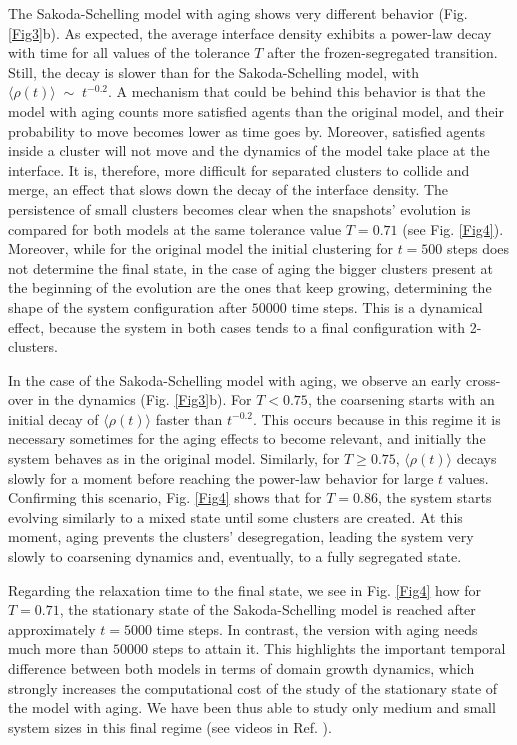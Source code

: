 The Sakoda-Schelling model with aging shows very different behavior (Fig. \ref{Fig3}b). As expected, the average interface density exhibits a power-law decay with time for all values of the tolerance $T$ after the frozen-segregated transition. Still, the decay is slower than for the Sakoda-Schelling model, with $\langle \rho (t)\rangle \; \sim \; t^{-0.2}$. A mechanism that could be behind this behavior is that the model with aging counts more satisfied agents than the original model, and their probability to move becomes lower as time goes by. Moreover, satisfied agents inside a cluster will not move and the dynamics of the model take place at the interface. It is, therefore, more difficult for separated clusters to collide and merge, an effect that slows down the decay of the interface density. The persistence of small clusters becomes clear when the snapshots' evolution is compared for both models at the same tolerance value $T = 0.71$ (see Fig. \ref{Fig4}). Moreover, while for the original model the initial clustering for $t = 500$ steps does not determine the final state, in the case of aging the bigger clusters present at the beginning of the evolution are the ones that keep growing, determining the shape of the system configuration after $50000$ time steps. This is a dynamical effect, because the system in both cases tends to a final configuration with 2-clusters.

In the case of the Sakoda-Schelling model with aging, we observe an early cross-over in the dynamics (Fig. \ref{Fig3}b). For $T < 0.75$, the coarsening starts with an initial decay of $\langle \rho (t)\rangle$ faster than $t^{-0.2}$. This occurs because in this regime it is necessary sometimes for the aging effects to become relevant, and initially the system behaves as in the original model. Similarly, for $T \ge 0.75$, $\langle \rho (t)\rangle$ decays slowly for a moment before reaching the power-law behavior for large $t$ values.  Confirming this scenario, Fig. \ref{Fig4} shows that for $T = 0.86$, the system starts evolving similarly to a mixed state until some clusters are created. At this moment, aging prevents the clusters' desegregation, leading the system very slowly to coarsening dynamics and, eventually, to a fully segregated state. 

Regarding the relaxation time to the final state, we see in Fig. \ref{Fig4} how for $T = 0.71$, the stationary state of the Sakoda-Schelling model is reached after approximately $t = 5000$ time steps. In contrast, the version with aging needs much more than $50000$ steps to attain it. This highlights the important temporal  difference between both models in terms of domain growth dynamics, which strongly increases the computational cost of the study of the stationary state of the model with aging. We have been thus able to study only medium and small system sizes in this final regime (see videos in Ref. \cite{supplementary_Abella_2022}).

